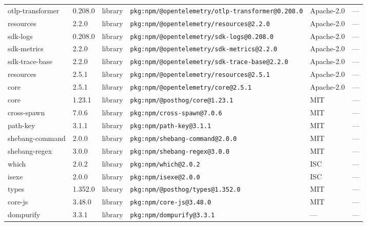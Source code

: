 \documentclass[11pt,a4paper]{article}
\begin{document}
\begin{longtable}{|p{4cm}|p{2cm}|p{1.6cm}|p{5cm}|p{1.5cm}|p{3.5cm}|}
\raggedright otlp-transformer & 0.208.0 & library & \small\texttt{pkg:npm/@opentelemetry/otlp-transformer@0.208.0} & Apache-2.0 & \small — \\
\raggedright resources & 2.2.0 & library & \small\texttt{pkg:npm/@opentelemetry/resources@2.2.0} & Apache-2.0 & \small — \\
\raggedright sdk-logs & 0.208.0 & library & \small\texttt{pkg:npm/@opentelemetry/sdk-logs@0.208.0} & Apache-2.0 & \small — \\
\raggedright sdk-metrics & 2.2.0 & library & \small\texttt{pkg:npm/@opentelemetry/sdk-metrics@2.2.0} & Apache-2.0 & \small — \\
\raggedright sdk-trace-base & 2.2.0 & library & \small\texttt{pkg:npm/@opentelemetry/sdk-trace-base@2.2.0} & Apache-2.0 & \small — \\
\raggedright resources & 2.5.1 & library & \small\texttt{pkg:npm/@opentelemetry/resources@2.5.1} & Apache-2.0 & \small — \\
\raggedright core & 2.5.1 & library & \small\texttt{pkg:npm/@opentelemetry/core@2.5.1} & Apache-2.0 & \small — \\
\raggedright core & 1.23.1 & library & \small\texttt{pkg:npm/@posthog/core@1.23.1} & MIT & \small — \\
\raggedright cross-spawn & 7.0.6 & library & \small\texttt{pkg:npm/cross-spawn@7.0.6} & MIT & \small — \\
\raggedright path-key & 3.1.1 & library & \small\texttt{pkg:npm/path-key@3.1.1} & MIT & \small — \\
\raggedright shebang-command & 2.0.0 & library & \small\texttt{pkg:npm/shebang-command@2.0.0} & MIT & \small — \\
\raggedright shebang-regex & 3.0.0 & library & \small\texttt{pkg:npm/shebang-regex@3.0.0} & MIT & \small — \\
\raggedright which & 2.0.2 & library & \small\texttt{pkg:npm/which@2.0.2} & ISC & \small — \\
\raggedright isexe & 2.0.0 & library & \small\texttt{pkg:npm/isexe@2.0.0} & ISC & \small — \\
\raggedright types & 1.352.0 & library & \small\texttt{pkg:npm/@posthog/types@1.352.0} & MIT & \small — \\
\raggedright core-js & 3.48.0 & library & \small\texttt{pkg:npm/core-js@3.48.0} & MIT & \small — \\
\raggedright dompurify & 3.3.1 & library & \small\texttt{pkg:npm/dompurify@3.3.1} & — & \small — \\

\end{longtable}
\end{document}
